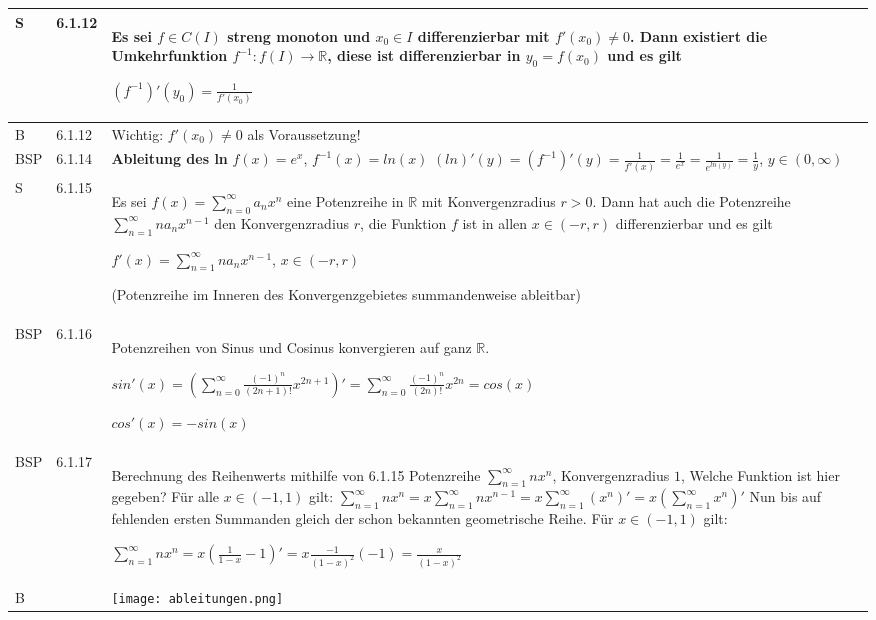 \begin{longtable}{p{0.75cm} p{1cm} p{16cm}}
        S   & 6.1.12&   Es sei $f \in C(I)$ streng monoton und $x_0 \in I$ differenzierbar mit \textbf{$f'(x_0) \neq 0$}. Dann existiert die
                        \textbf{Umkehrfunktion} $f^{-1}: f(I) \rightarrow \mathbb{R}$, diese ist differenzierbar in $y_0 = f(x_0)$ und es gilt \hfill \break
                        \centerline{$(f^{-1})'(y_0) = \frac{1}{f'(x_0)} $} \\
        \midrule
        B   & 6.1.12&   Wichtig: $f'(x_0) \neq 0$ als Voraussetzung! \\
        \midrule
        BSP & 6.1.14&   \textbf{Ableitung des ln} \hfill \break
                        $f(x) = e^x$, $f^{-1}(x) = ln(x)$ \hfill \break
                        $(ln)'(y) = (f^{-1})'(y) = \frac{1}{f'(x)} = \frac{1}{e^x} = \frac{1}{e^{ln(y)}} = \frac{1}{y}$, $y \in (0, \infty)$ \\
        \midrule
        S   & 6.1.15&   Es sei $f(x) = \sum^{\infty}_{n=0} a_n  x^n$ eine Potenzreihe in $\mathbb{R}$ mit Konvergenzradius $r >0$. Dann hat
                        auch die Potenzreihe $\sum^{\infty}_{n=1} na_nx^{n-1}$ den Konvergenzradius $r$, die Funktion $f$ ist in allen
                        $x \in (-r,r)$ differenzierbar und es gilt \hfill \break
                        \centerline{$f'(x) = \sum^{\infty}_{n=1} na_n x^{n-1}$, $x \in (-r,r)$}
                        (Potenzreihe im Inneren des Konvergenzgebietes summandenweise ableitbar)\\
        \midrule
        BSP & 6.1.16&   Potenzreihen von Sinus und Cosinus konvergieren auf ganz $\mathbb{R}$. \hfill \break
                        \centerline{$ sin'(x) = (\sum^{\infty}_{n=0} \frac{(-1)^n}{(2n+1)!} x^{2n+1})' = 
                        \sum^{\infty}_{n=0} \frac{(-1)^n}{(2n)!}x^{2n} = cos(x)$}
                        \centerline{$cos'(x) = -sin(x)$} \\
        \midrule
        BSP & 6.1.17&   Berechnung des Reihenwerts mithilfe von 6.1.15 \hfill \break
                        Potenzreihe $\sum^{\infty}_{n=1} nx^n$, Konvergenzradius $1$, Welche Funktion ist hier gegeben? \hfill \break
                        Für alle $x\in (-1,1)$ gilt: $\sum^{\infty}_{n=1} nx^n = x \sum^{\infty}_{n=1} nx^{n-1} =
                        x \sum^{\infty}_{n=1} (x^n)' = x(\sum^{\infty}_{n=1} x^n)'$ \hfill \break
                        Nun bis auf fehlenden ersten Summanden gleich der schon bekannten geometrische Reihe. Für $x \in (-1,1)$ gilt: \hfill \break
                        \centerline{$ \sum^{\infty}_{n=1} nx^n = x( \frac{1}{1-x} - 1)' = x \frac{-1}{(1-x)^2}(-1) = \frac{x}{(1-x)^2} $} \\
        \midrule
        B   &       &   \texttt{[image: ableitungen.png]} \\
        \bottomrule
    \end{longtable}

